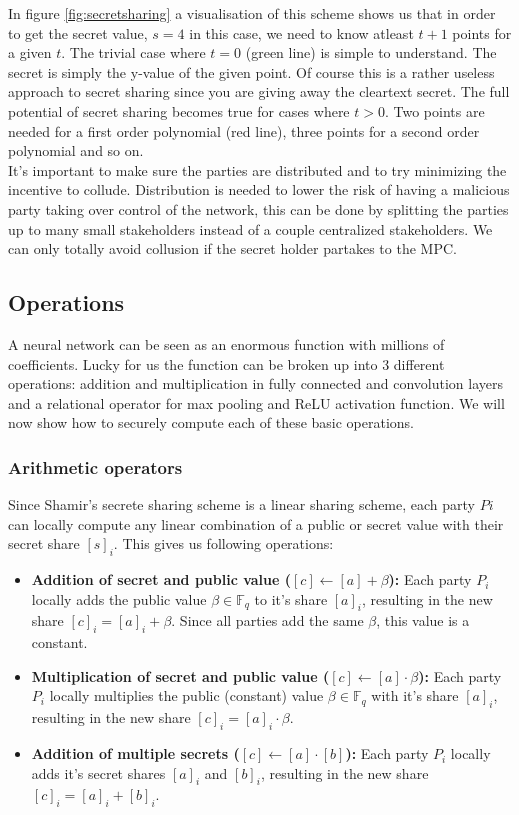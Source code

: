 
In figure \ref{fig:secretsharing} a visualisation of this scheme shows us that in order to get the secret value, $s=4$ in this case, we need to know atleast $t+1$ points for a given $t$. The trivial case where $t=0$ (green line) is simple to understand. The secret is simply the y-value of the given point. Of course this is a rather useless approach to secret sharing since you are giving away the cleartext secret. The full potential of secret sharing becomes true for cases where $t>0$. Two points are needed for a first order polynomial (red line), three points for a second order polynomial and so on.\\
It's important to make sure the parties are distributed and to try minimizing the incentive to collude. Distribution is needed to lower the risk of having a malicious party taking over control of the network, this can be done by splitting the parties up to many small stakeholders instead of a couple centralized stakeholders. We can only totally avoid collusion if the secret holder partakes to the MPC.

\subsection{Operations}
A neural network can be seen as an enormous function with millions of coefficients. Lucky for us the function can be broken up into 3 different operations: addition and multiplication in fully connected and convolution layers and a relational operator for max pooling and ReLU activation function. We will now show how to securely compute each of these basic operations.

\subsubsection{Arithmetic operators}
Since Shamir's secrete sharing scheme is a linear sharing scheme, each party $Pi$ can locally compute any linear combination of a public or secret value with their secret share $[s]_i$. This gives us following operations:
\begin{itemize}
  \item \textbf{Addition of secret and public value ($[c] \gets [a] + \beta$):} Each party $P_i$ locally adds the public value $\beta \in \mathbb{F}_q$ to it's share $[a]_i$, resulting in the new share $[c]_i = [a]_i + \beta$. Since all parties add the same $\beta$, this value is a constant.
  \item \textbf{Multiplication of secret and public value ($[c] \gets [a] \cdot \beta$):} Each party $P_i$ locally multiplies the public (constant) value $\beta \in \mathbb{F}_q$ with it's share $[a]_i$, resulting in the new share $[c]_i = [a]_i \cdot \beta$.
  \item \textbf{Addition of multiple secrets ($[c] \gets [a] \cdot [b]$):} Each party $P_i$ locally adds it's secret shares $[a]_i$ and $[b]_i$, resulting in the new share $[c]_i = [a]_i + [b]_i$.
\end{itemize}

